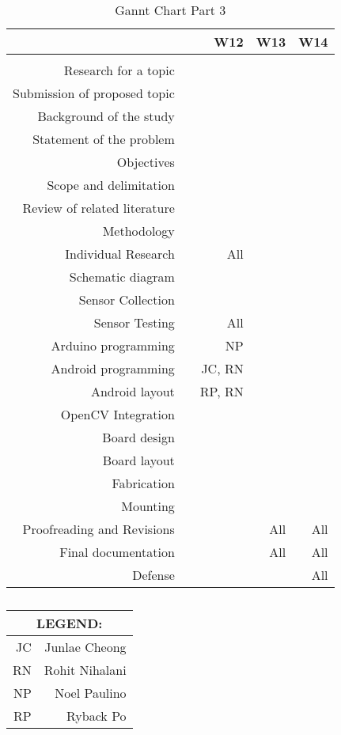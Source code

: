 \begin{table}[htbp]
  \centering
  \caption{Gannt Chart Part 3}
    \begin{tabular}{rrrrr}
    \toprule
      &   & W12 & W13 & W14 \\
    \midrule
      &   &   &   &  \\
    Research for a topic &   &   &   &  \\
    Submission of proposed topic &   &   &   &  \\
    Background of the study &   &   &   &  \\
    Statement of the problem &   &   &   &  \\
    Objectives &   &   &   &  \\
    Scope and delimitation &   &   &   &  \\
    Review of related literature &   &   &   &  \\
    Methodology &   &   &   &  \\
    Individual Research &   & All &   &  \\
    Schematic diagram &   &   &   &  \\
    Sensor Collection &   &   &   &  \\
    Sensor Testing &   & All &   &  \\
    Arduino programming &   & NP &   &  \\
    Android programming &   & JC, RN &   &  \\
    Android layout &   & RP, RN &   &  \\
    OpenCV Integration &   &   &   &  \\
    Board design &   &   &   &  \\
    Board layout &   &   &   &  \\
    Fabrication &   &   &   &  \\
    Mounting &   &   &   &  \\
    Proofreading and Revisions &   &   & All & All \\
    Final documentation &   &   & All & All \\
    Defense &   &   &   & All \\
    \bottomrule
    \end{tabular}%
  \label{tab:addlabel}%
\end{table}%

\begin{table}[htbp]
  \centering
  \caption{ }
    \begin{tabular}{rr}
    \toprule
    \multicolumn{2}{c}{LEGEND:} \\
    \midrule
    JC & Junlae Cheong \\
    RN & Rohit Nihalani \\
    NP & Noel Paulino \\
    RP & Ryback Po \\
    \bottomrule
    \end{tabular}%
  \label{tab:addlabel}%
\end{table}%


